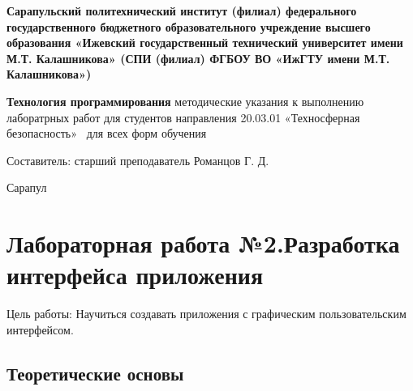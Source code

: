 \documentclass[a4paper]{article}
\begin{document}
\begin{titlepage}
  \newpage
  \begin{center}
    {\bfseries Сарапульский политехнический институт (филиал)
      федерального государственного бюджетного образовательного
      учреждение высшего образования
      «Ижевский государственный технический университет имени М.Т. Калашникова» \linebreak
      (СПИ (филиал) ФГБОУ ВО «ИжГТУ имени \linebreak
      М.Т. Калашникова»)
    }
  \end{center}
    \begin{center}
      \topskip=0pt
      \vspace*{\fill}
      \large \textbf{Технология программирования} \linebreak
      методические указания к выполнению лаборатрных работ \linebreak
      для студентов направления 20.03.01 \linebreak
      «Техносферная безопасность» \linebreak
      для всех форм обучения 
      \vspace*{\fill}
    \end{center}
    \begin{center}
      Составитель:
      \hspace*{\fill} старший преподаватель \linebreak
      \hspace*{\fill} Романцов Г. Д.
    \end{center}
     \begin{center}
       \vspace*{\fill}
       Сарапул
    \end{center}
  \end{titlepage}

  \tableofcontents

\newpage
\section{Лабораторная работа №2.\newline Разработка интерфейса приложения}

Цель работы: Научиться создавать приложения с графическим пользовательским интерфейсом.

\subsection{Теоретические основы}
\end{document}
